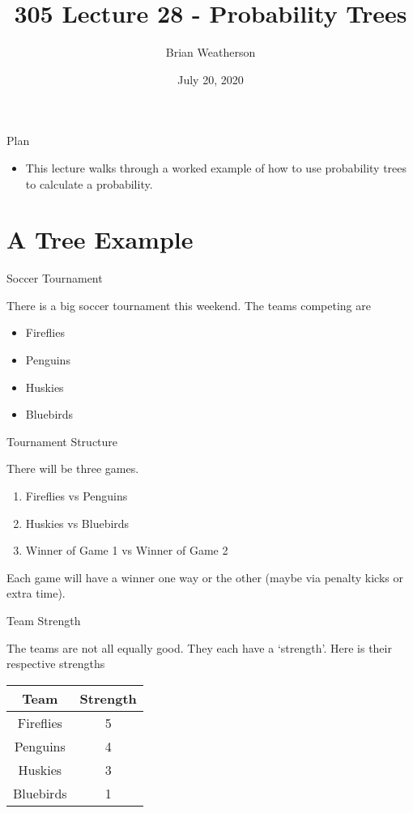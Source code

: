 \documentclass[
  ignorenonframetext,
]{beamer}
\title{305 Lecture 28 - Probability Trees}
\author{Brian Weatherson}
\date{July 20, 2020}
\providecommand{\tightlist}{%
  \setlength{\itemsep}{0pt}\setlength{\parskip}{0pt}}
\renewcommand{\,}{\text{, }}
\begin{document}
\frame{\titlepage}

\begin{frame}{Plan}
\protect\hypertarget{plan}{}

\begin{itemize}
\tightlist
\item
  This lecture walks through a worked example of how to use probability
  trees to calculate a probability.
\end{itemize}

\end{frame}

\hypertarget{a-tree-example}{%
\section{A Tree Example}\label{a-tree-example}}

\begin{frame}{Soccer Tournament}
\protect\hypertarget{soccer-tournament}{}

There is a big soccer tournament this weekend. The teams competing are

\begin{itemize}
\tightlist
\item
  Fireflies
\item
  Penguins
\item
  Huskies
\item
  Bluebirds
\end{itemize}

\end{frame}

\begin{frame}{Tournament Structure}
\protect\hypertarget{tournament-structure}{}

There will be three games.

\begin{enumerate}
\tightlist
\item
  Fireflies vs Penguins
\item
  Huskies vs Bluebirds
\item
  Winner of Game 1 vs Winner of Game 2
\end{enumerate}

Each game will have a winner one way or the other (maybe via penalty
kicks or extra time).

\end{frame}

\begin{frame}{Team Strength}
\protect\hypertarget{team-strength}{}

The teams are not all equally good. They each have a `strength'. Here is
their respective strengths

\begin{longtable}[]{@{}cc@{}}
\toprule
Team & Strength\tabularnewline
\midrule
\endhead
Fireflies & 5\tabularnewline
Penguins & 4\tabularnewline
Huskies & 3\tabularnewline
Bluebirds & 1\tabularnewline
\bottomrule
\end{longtable}

\end{frame}
\end{document}

